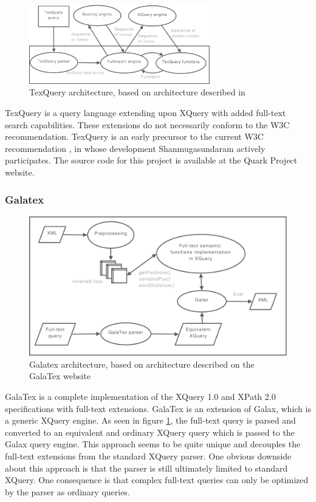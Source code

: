 \begin{figure}[!h]
  \centering
    \includegraphics[width=0.7\textwidth]{diagrams/texquery_arch}
  \caption[TexQuery architecture]{TexQuery architecture, based on architecture described in
  \cite{texquery_fulltextsearch}}
\end{figure}

TexQuery is a query language extending upon XQuery with added full-text search 
capabilities. These extensions do not necessarily conform to the W3C
recommendation. TexQuery is an early precursor to the current W3C 
recommendation \cite{TEXQ00}, in whose development Shanmugasundaram actively 
participates. The source code for this project is available at the Quark Project
website\cite{quarkproject}.

\subsubsection{Galatex}
\begin{figure}[!h]
  \centering
    \includegraphics[width=1\textwidth]{diagrams/galatex_arch}
  \caption[GalaTex architecture]{Galatex architecture, based on architecture described on
  the GalaTex website\cite{galatex}}
  \label{figure:galatex:arch}
\end{figure}

GalaTex is a complete implementation of the XQuery 1.0 and XPath 2.0
specifications with full-text extensions. GalaTex is an extension of Galax,
which is a generic XQuery engine. As seen in figure \ref{figure:galatex:arch}, 
the full-text query is parsed and converted to an equivalent and ordinary XQuery
query which is passed to the Galax query engine. This approach seems to be quite
unique and decouples the full-text extensions from the standard XQuery parser.
One obvious downside about this approach is that the parser is still ultimately
limited to standard XQuery. One consequence is that complex full-text queries
can only be optimized by the parser as ordinary queries.

